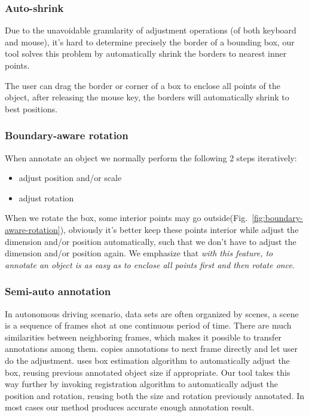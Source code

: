 \documentclass[letterpaper, 10 pt, conference]{ieeeconf}  %
\begin{document}
\subsubsection{Auto-shrink}

Due to the unavoidable granularity of adjustment operations (of both keyboard and mouse), it's hard to determine precisely the border of a bounding box, our tool solves this problem by automatically shrink the borders to nearest inner points.

The user can drag the border or corner of a box to enclose all points of the object, after releasing the mouse key, the borders will automatically shrink to best positions.

\subsubsection{Boundary-aware rotation}

When annotate an object we normally perform the following 2 steps iteratively:
\begin{itemize}
	\item adjust position and/or scale
	\item adjust rotation	
\end{itemize}

When we rotate the box, some interior points may go outside(Fig.~\ref{fig:boundary-aware-rotation}), obviously it's better keep these points interior while adjust the dimension and/or position automatically, such that we don't have to adjust the dimension and/or position again. We emphasize that \emph{with this feature, to annotate an object is as easy as to enclose all points first and then rotate once}.




\subsubsection{Semi-auto annotation}
\label{semi-auto-anno}
In autonomous driving scenario, data sets are often organized by scenes\cite{Caesar2019nuScenesAM,Patil2019TheHD,lyft2019}, a scene is a sequence of frames shot at one continuous period of time. There are much similarities between neighboring frames, which makes it possible to transfer annotations among them. \cite{Zimmer20193DBA} copies annotations to next frame directly and let user do the adjustment.\cite{Wang2019LATTEAL} uses box estimation algorithm to automatically adjust the box, reusing previous annotated object size if appropriate. Our tool takes this way further by invoking registration algorithm \cite{Yang2016GoICPAG} to automatically adjust the position and rotation, reusing both the size and rotation previously annotated. In most cases our method produces  accurate enough annotation result.
\end{document}
